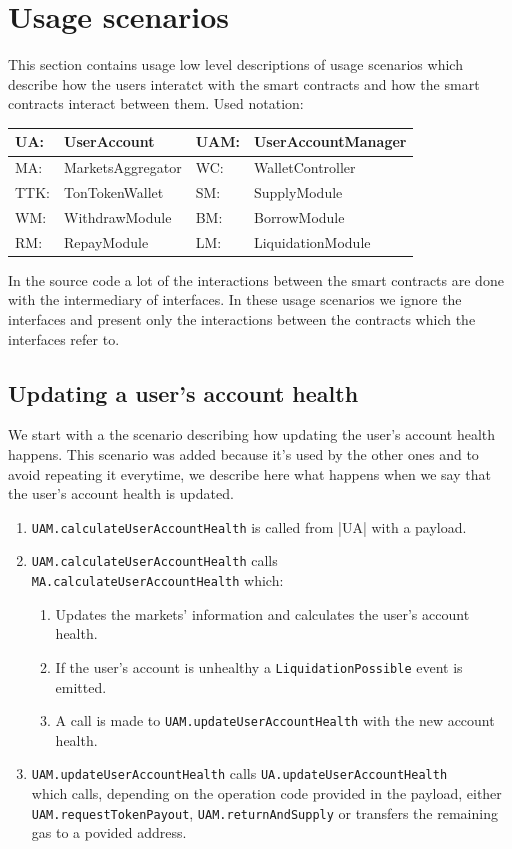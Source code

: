 \section{Usage scenarios}

This section contains usage low level descriptions of usage scenarios which describe how the users interatct with the smart contracts and how the smart contracts interact between them. 
\newpage
Used notation:

\begin{tabularx}{\textwidth}{|l X|l X|} \hline 
  UA: & UserAccount &         UAM: & UserAccountManager \\\hline 
  MA: & MarketsAggregator &   WC: & WalletController \\\hline
  TTK: & TonTokenWallet &     SM: & SupplyModule \\\hline
  WM: & WithdrawModule &      BM: & BorrowModule \\\hline
  RM: & RepayModule &         LM: & LiquidationModule \\\hline
\end{tabularx}

In the source code a lot of the interactions between the smart contracts are done with the intermediary of interfaces. In these usage scenarios we ignore the interfaces and present only the interactions between the contracts which the interfaces refer to. 

\subsection{Updating a user's account health}
We start with a the scenario describing how updating the user's account health happens. This scenario was added because it's used by the other ones and to avoid repeating it everytime, we describe here what happens when we say that the user's account health is updated.

\begin{enumerate}
  \item \verb|UAM.calculateUserAccountHealth| is called from |UA| with a payload.
  \item \verb|UAM.calculateUserAccountHealth| calls \\\verb|MA.calculateUserAccountHealth| which:
  \begin{enumerate}[label*=\arabic*.]
    \item Updates the markets' information and calculates the user's account health.
    \item If the user's account is unhealthy a \verb|LiquidationPossible| event is emitted.
    \item A call is made to \verb|UAM.updateUserAccountHealth| with the new account health.
  \end{enumerate}
  \item \verb|UAM.updateUserAccountHealth| calls \verb|UA.updateUserAccountHealth| \\which calls, depending on the operation code provided in the payload, either \verb|UAM.requestTokenPayout|, \verb|UAM.returnAndSupply| or transfers the remaining gas to a povided address.
\end{enumerate}

